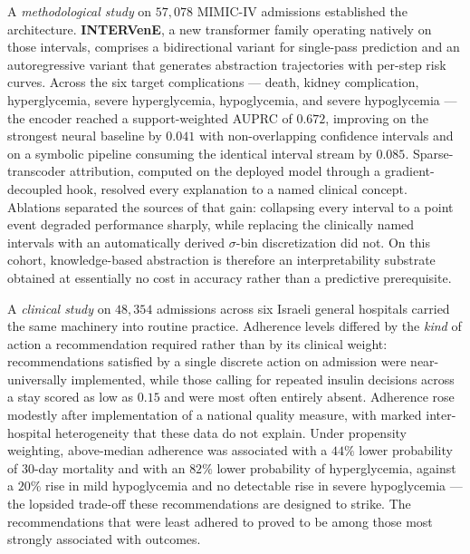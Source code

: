 A \emph{methodological study} on $57{,}078$ MIMIC-IV admissions established the architecture. \textbf{INTERVenE}, a new transformer family operating natively on those intervals, comprises a bidirectional variant for single-pass prediction and an autoregressive variant that generates abstraction trajectories with per-step risk curves. Across the six target complications --- death, kidney complication, hyperglycemia, severe hyperglycemia, hypoglycemia, and severe hypoglycemia --- the encoder reached a support-weighted AUPRC of $0.672$, improving on the strongest neural baseline by $0.041$ with non-overlapping confidence intervals and on a symbolic pipeline consuming the identical interval stream by $0.085$. Sparse-transcoder attribution, computed on the deployed model through a gradient-decoupled hook, resolved every explanation to a named clinical concept. Ablations separated the sources of that gain: collapsing every interval to a point event degraded performance sharply, while replacing the clinically named intervals with an automatically derived $\sigma$-bin discretization did not. On this cohort, knowledge-based abstraction is therefore an interpretability substrate obtained at essentially no cost in accuracy rather than a predictive prerequisite.

A \emph{clinical study} on $48{,}354$ admissions across six Israeli general hospitals carried the same machinery into routine practice. Adherence levels differed by the \emph{kind} of action a recommendation required rather than by its clinical weight: recommendations satisfied by a single discrete action on admission were near-universally implemented, while those calling for repeated insulin decisions across a stay scored as low as $0.15$ and were most often entirely absent. Adherence rose modestly after implementation of a national quality measure, with marked inter-hospital heterogeneity that these data do not explain. Under propensity weighting, above-median adherence was associated with a $44\%$ lower probability of $30$-day mortality and with an $82\%$ lower probability of hyperglycemia, against a $20\%$ rise in mild hypoglycemia and no detectable rise in severe hypoglycemia --- the lopsided trade-off these recommendations are designed to strike. The recommendations that were least adhered to proved to be among those most strongly associated with outcomes.

